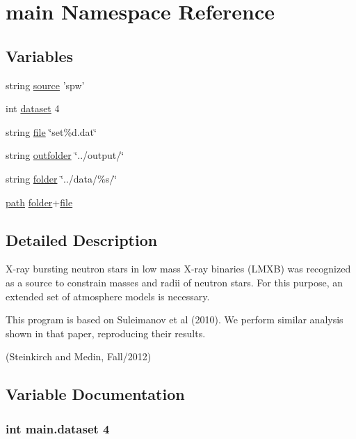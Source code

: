 \hypertarget{namespacemain}{\section{main Namespace Reference}
\label{namespacemain}
}
\subsection*{Variables}
\begin{DoxyCompactItemize}
\item 
string \hyperlink{namespacemain_a75667a1170a74674aa6f7fa04dca3f51}{source} 'spw'
\item 
int \hyperlink{namespacemain_a978c0348c9f6cc941363ad5ac76e51b8}{dataset} 4
\item 
string \hyperlink{namespacemain_aecd6226a151c6d5a3cf8e14eff8ab1ab}{file} \char`\"{}set\%d.\-dat\char`\"{}
\item 
string \hyperlink{namespacemain_a2daf9a8b215310e0e292637326976e40}{outfolder} \char`\"{}../output/\char`\"{}
\item 
string \hyperlink{namespacemain_a420838a5c4271000147fb1071b83c027}{folder} \char`\"{}../data/\%s/\char`\"{}
\item 
\hyperlink{namespacemain_a2a2f58348e4a36c9b004f7eacab52fa2}{path} \hyperlink{namespacemain_a420838a5c4271000147fb1071b83c027}{folder}+\hyperlink{namespacemain_aecd6226a151c6d5a3cf8e14eff8ab1ab}{file}
\end{DoxyCompactItemize}


\subsection{Detailed Description}
\begin{DoxyVerb}X-ray bursting neutron stars in low mass X-ray binaries (LMXB) was recognized
as a source to constrain masses and radii of neutron stars. For this purpose, an 
extended set of atmosphere models is necessary.

This program is based on Suleimanov et al (2010). We perform similar analysis
shown in that paper, reproducing their results.

(Steinkirch and Medin, Fall/2012)\end{DoxyVerb}
 

\subsection{Variable Documentation}
\hypertarget{namespacemain_a978c0348c9f6cc941363ad5ac76e51b8}{
\subsubsection[{dataset}]{\setlength{\rightskip}{0pt plus 5cm}int main.\-dataset 4}}\label{namespacemain_a978c0348c9f6cc941363ad5ac76e51b8}


